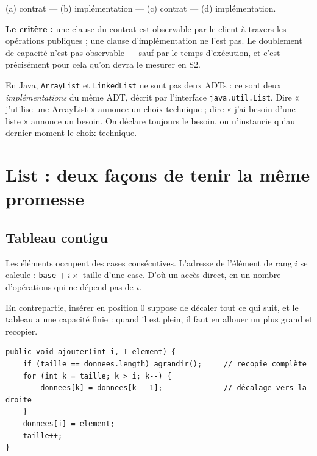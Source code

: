 \documentclass[11pt,a4paper]{article}
\theoremstyle{definition}
\theoremstyle{remark}
\begin{document}
\begin{appliboxR}[Réponse]
(a) contrat --- (b) implémentation --- (c) contrat --- (d) implémentation.

\textbf{Le critère :} une clause du contrat est observable par le client à
travers les opérations publiques ; une clause d'implémentation ne l'est pas.
Le doublement de capacité n'est pas observable --- sauf par le temps
d'exécution, et c'est précisément pour cela qu'on devra le mesurer en S2.
\end{appliboxR}

\begin{attentionbox}
En Java, \texttt{ArrayList} et \texttt{LinkedList} ne sont pas deux ADTs :
ce sont deux \emph{implémentations} du même ADT, décrit par l'interface
\texttt{java.util.List}. Dire « j'utilise une ArrayList » annonce un choix
technique ; dire « j'ai besoin d'une liste » annonce un besoin. On déclare
toujours le besoin, on n'instancie qu'au dernier moment le choix technique.
\end{attentionbox}

\section{List : deux façons de tenir la même promesse}

\subsection{Tableau contigu}

Les éléments occupent des cases consécutives. L'adresse de l'élément de rang
$i$ se calcule : \texttt{base} $+\ i \times$ taille d'une case. D'où un accès
direct, en un nombre d'opérations qui ne dépend pas de $i$.

En contrepartie, insérer en position $0$ suppose de décaler tout ce qui suit,
et le tableau a une capacité finie : quand il est plein, il faut en allouer un
plus grand et recopier.

\begin{lstlisting}[caption={Insertion en tête dans un tableau : le décalage}]
public void ajouter(int i, T element) {
    if (taille == donnees.length) agrandir();     // recopie complète
    for (int k = taille; k > i; k--) {
        donnees[k] = donnees[k - 1];              // décalage vers la droite
    }
    donnees[i] = element;
    taille++;
}
\end{lstlisting}
\end{document}
